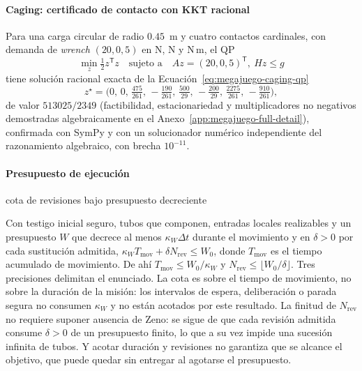 \paragraph{Caging: certificado de contacto con KKT racional}
Para una carga circular de radio $0.45$~m y cuatro contactos cardinales, con
demanda de \emph{wrench} $(20,0,5)$ en N, N y N\,m, el QP
\begin{equation}
 \min_z\tfrac12z^{\mathsf T}z \quad\text{sujeto a}\quad Az=(20,0,5)^{\mathsf T},\ Hz\leq g
 \label{eq:megajuego-caging-qp}
\end{equation}
tiene solución racional exacta de la Ecuación~\eqref{eq:megajuego-caging-qp}
\[
 z^\star=\Big(0,\,0,\,\tfrac{475}{261},\,-\tfrac{190}{261},\,\tfrac{500}{29},\,-\tfrac{200}{29},\,\tfrac{2275}{261},\,-\tfrac{910}{261}\Big),
\]
de valor $513025/2349$ (factibilidad, estacionariedad y multiplicadores no
negativos demostradas algebraicamente en el
Anexo~\ref{app:megajuego-full-detail}), confirmada con SymPy y con un
solucionador numérico independiente del razonamiento algebraico, con brecha
$10^{-11}$.

\paragraph{Presupuesto de ejecución}
\begin{contribucion}{cota de revisiones bajo presupuesto decreciente}
\begin{teorema}
\label{thm:megajuego-execution-budget}
Con testigo inicial seguro, tubos que componen, entradas locales realizables y
un presupuesto $W$ que decrece al menos $\kappa_W\Delta t$ durante el
movimiento y en $\delta>0$ por cada sustitución admitida,
$\kappa_WT_{\mathrm{mov}}+\delta N_{\mathrm{rev}}\leq W_0$, donde
$T_{\mathrm{mov}}$ es el tiempo acumulado de movimiento. De ahí
$T_{\mathrm{mov}}\leq W_0/\kappa_W$ y $N_{\mathrm{rev}}\leq\lfloor W_0/\delta\rfloor$.
Tres precisiones delimitan el enunciado. La cota es sobre el tiempo de
movimiento, no sobre la duración de la misión: los intervalos de espera,
deliberación o parada segura no consumen $\kappa_W$ y no están acotados por
este resultado. La finitud de $N_{\mathrm{rev}}$ no requiere suponer ausencia
de Zeno: se sigue de que cada revisión admitida consume $\delta>0$ de un
presupuesto finito, lo que a su vez impide una sucesión infinita de tubos. Y
acotar duración y revisiones no garantiza que se alcance el objetivo, que
puede quedar sin entregar al agotarse el presupuesto.
\end{teorema}
\end{contribucion}

